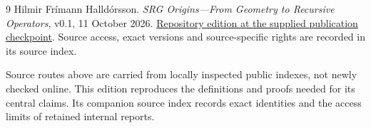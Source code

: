 \documentclass[11pt,a4paper]{article}
\theoremstyle{remark}\newtheorem{remark}[theorem]{Remark}
\numberwithin{equation}{section}
\begin{document}
\begin{thebibliography}{9}
Hilmir Fr\'imann Halld\'orsson.
\emph{SRG Origins---From Geometry to Recursive Operators}, v0.1,
11 October 2026.
\href{https://github.com/pzychozen/trioctagon-physics/tree/3e5972be2f233b6c8ec3c2ebe0687ee1f8f2ff1f/SRG_REDISCOVERY/PAPERS/SRG_ORIGINS_FROM_GEOMETRY_TO_RECURSION/publication/v0.1}{Repository edition at the supplied publication checkpoint}.
Source access, exact versions and source-specific rights are recorded
in its source index.

\end{thebibliography}

\small
Source routes above are carried from locally inspected public indexes,
not newly checked online. This edition reproduces the definitions and proofs
needed for its central claims. Its companion source index records exact
identities and the access limits of retained internal reports.
\end{document}
